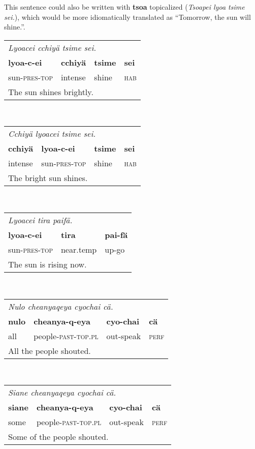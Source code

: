 \documentclass{article}
\begin{document}
This sentence could also be written with \textbf{tsoa} topicalized (\emph{Tsoapei lyoa tsime sei.}), which would be more idiomatically translated as ``Tomorrow, the sun will shine.''.
\\[0.5cm]
\begin{tabular}{l l l l}
\multicolumn{4}{l}{\emph{Lyoacei cchiy\"a tsime sei.}} \\
\textbf{lyoa-c-ei} & \textbf{cchiy\"a} & \textbf{tsime} & \textbf{sei} \\
sun-\textsc{pres-top} & intense & shine & \textsc{hab} \\
\multicolumn{4}{l}{The sun shines brightly.} \\
\end{tabular}
\\[0.5cm]
\begin{tabular}{l l l l}
\multicolumn{4}{l}{\emph{Cchiy\"a lyoacei tsime sei.}} \\
\textbf{cchiy\"a} & \textbf{lyoa-c-ei} & \textbf{tsime} & \textbf{sei} \\
intense & sun-\textsc{pres-top} & shine & \textsc{hab} \\
\multicolumn{4}{l}{The bright sun shines.} \\
\end{tabular}
\\[0.5cm]
\begin{tabular}{l l l}
\multicolumn{3}{l}{\emph{Lyoacei tira paif\"a.}} \\
\textbf{lyoa-c-ei} & \textbf{tira} & \textbf{pai-f\"a} \\
sun-\textsc{pres-top} & near.temp & up-go \\
\multicolumn{3}{l}{The sun is rising now.} \\
\end{tabular}
\\[0.5cm]
\begin{tabular}{l l l l}
\multicolumn{4}{l}{\emph{Nulo cheanyaqeya cyochai c\"a.}} \\
\textbf{nulo} & \textbf{cheanya-q-eya} & \textbf{cyo-chai} & \textbf{c\"a} \\
all & people-\textsc{past-top.pl} & out-speak & \textsc{perf} \\
\multicolumn{4}{l}{All the people shouted.} \\
\end{tabular}
\\[0.5cm]
\begin{tabular}{l l l l}
\multicolumn{4}{l}{\emph{Siane cheanyaqeya cyochai c\"a.}} \\
\textbf{siane} & \textbf{cheanya-q-eya} & \textbf{cyo-chai} & \textbf{c\"a} \\
some & people-\textsc{past-top.pl} & out-speak & \textsc{perf} \\
\multicolumn{4}{l}{Some of the people shouted.} \\
\end{tabular}
\end{document}

